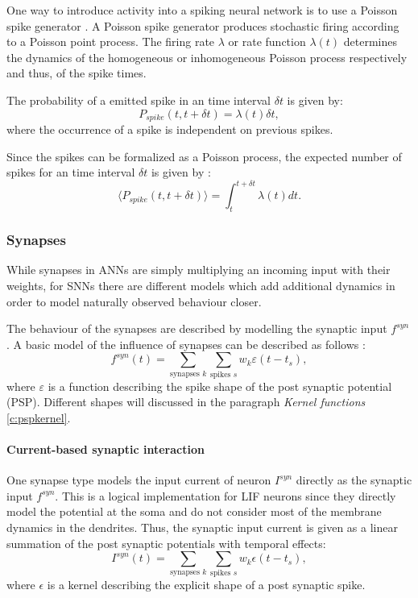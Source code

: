 One way to introduce activity into a spiking neural network is to use a Poisson spike generator \cite{Heeger2000}.
A Poisson spike generator produces stochastic firing according to a Poisson point process.
The firing rate $\lambda$ or rate function $\lambda(t)$ determines the dynamics of the homogeneous or inhomogeneous Poisson process respectively and thus, of the spike times.   

The probability of a emitted spike in an time interval $\delta t$ is given by: 
\[
P_{spike}({t , t+ \delta t}) = \lambda(t) \delta t,
\]
where the occurrence of a spike is independent on previous spikes. 

Since the spikes can be formalized as a Poisson process, the expected number of spikes for an time interval $\delta t$ is given by :
\[
\langle  P_{spike}({t , t+ \delta t}) \rangle = \int_t^{t + \delta t} \lambda(t) dt.
\]


\subsubsection{Synapses} \label{c:synapses}

While synapses in ANNs are simply multiplying an incoming input with their weights, for SNNs there are different models which add additional dynamics in order to model naturally observed behaviour closer. 

The behaviour of the synapses are described by modelling the synaptic input $f^{syn}$. A basic model of the influence of synapses can be described as follows \cite{Petrovici2016}:
\[
f^{syn}(t) = \sum_{\text{synapses } k } \sum_{\text{spikes } s} w_k \varepsilon(t - t_s),
\]
where $\varepsilon$ is a function describing the spike shape of the post synaptic potential (PSP).
Different shapes will discussed in the paragraph \textit{Kernel functions} \ref{c:pspkernel}.

\paragraph{Current-based synaptic interaction} \label{c:cuba}
One synapse type models the input current of neuron $I^{syn}$ directly as the synaptic input $f^{syn}$. This is a logical implementation for LIF neurons since they directly model the potential at the soma and do not consider most of the membrane dynamics in the dendrites. 
Thus, the synaptic input current is given as a linear summation of the post synaptic potentials with temporal effects:
\[
I^{syn}(t) = \sum_{\text{synapses } k } \sum_{\text{spikes } s} w_k \epsilon(t - t_s),
\]
where $\epsilon$ is a kernel describing the explicit shape of a post synaptic spike.

